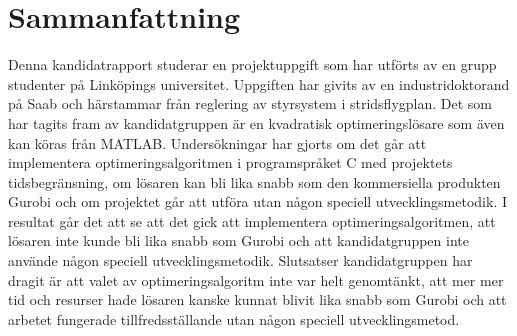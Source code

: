 \section{Sammanfattning}
Denna kandidatrapport studerar en projektuppgift som har utförts av en grupp studenter på Linköpings universitet. Uppgiften har givits av en industridoktorand på Saab och härstammar från reglering av styrsystem i stridsflygplan. Det som har tagits fram av kandidatgruppen är en  kvadratisk optimeringslösare som även kan köras från MATLAB. Undersökningar har gjorts om det går att implementera optimeringsalgoritmen i programspråket C med projektets tidsbegränsning, om lösaren kan bli lika snabb som den kommersiella produkten Gurobi och om projektet går att utföra utan någon speciell utvecklingsmetodik. I resultat går det att se att det gick att implementera optimeringsalgoritmen, att lösaren inte kunde bli lika snabb som Gurobi och att kandidatgruppen inte använde någon speciell utvecklingsmetodik. Slutsatser kandidatgruppen har dragit är att valet av optimeringsalgoritm inte var helt genomtänkt, att mer mer tid och resurser hade lösaren kanske kunnat blivit lika snabb som Gurobi och att arbetet fungerade tillfredsställande utan någon speciell utvecklingsmetod.     